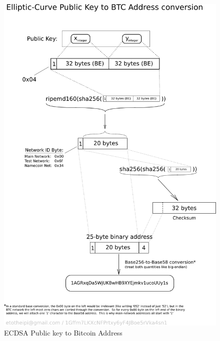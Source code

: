 \begin{figure}[htb]
\centering
\includegraphics[width=\linewidth]{fig/PubKeyToAddr.png}
  \caption{ECDSA Public key to Bitcoin Address ~\cite{techaddress}}
\label{fig:pubkeytoaddr}
\end{figure}


